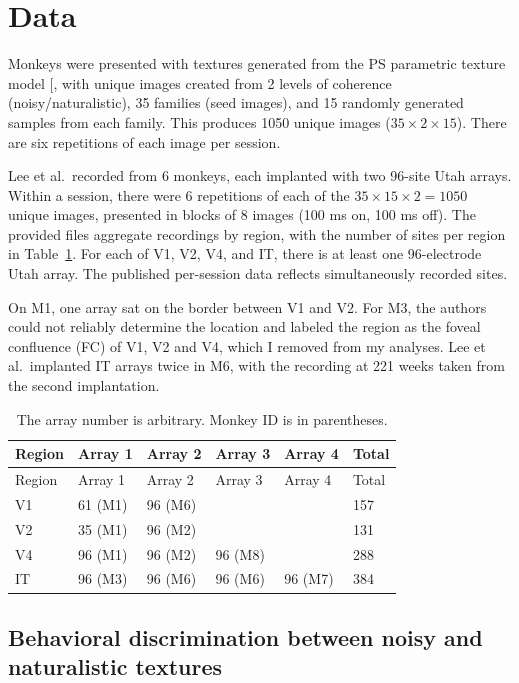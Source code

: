 \documentclass[
  11pt,
  letterpaper,
  DIV=11,
  numbers=noendperiod]{scrartcl}
\begin{document}
\section{Data}\label{sec-data}

Monkeys were presented with textures generated from the PS parametric
texture model {[}\citeproc{ref-portilla_parametric_2000}{1}{]}, with
unique images created from 2 levels of coherence (noisy/naturalistic),
35 families (seed images), and 15 randomly generated samples from each
family. This produces 1050 unique images (\(35 \times 2 \times 15\)).
There are six repetitions of each image per session.

Lee et al.~recorded from 6 monkeys, each implanted with two 96-site Utah
arrays. Within a session, there were 6 repetitions of each of the
\(35 \times 15 \times 2 = 1050\) unique images, presented in blocks of 8
images (100 ms on, 100 ms off). The provided files aggregate recordings
by region, with the number of sites per region in Table~\ref{tbl-sites}.
For each of V1, V2, V4, and IT, there is at least one 96-electrode Utah
array. The published per-session data reflects simultaneously recorded
sites.

On M1, one array sat on the border between V1 and V2. For M3, the
authors could not reliably determine the location and labeled the region
as the foveal confluence (FC) of V1, V2 and V4, which I removed from my
analyses. Lee et al.~implanted IT arrays twice in M6, with the recording
at 221 weeks taken from the second implantation.

\begin{longtable}[]{@{}llllll@{}}
\caption{The array number is arbitrary. Monkey ID is in
parentheses.}\label{tbl-sites}\tabularnewline
\toprule\noalign{}
Region & Array 1 & Array 2 & Array 3 & Array 4 & Total \\
\midrule\noalign{}
\endfirsthead
\toprule\noalign{}
Region & Array 1 & Array 2 & Array 3 & Array 4 & Total \\
\midrule\noalign{}
\endhead
\bottomrule\noalign{}
\endlastfoot
V1 & 61 (M1) & 96 (M6) & & & 157 \\
V2 & 35 (M1) & 96 (M2) & & & 131 \\
V4 & 96 (M1) & 96 (M2) & 96 (M8) & & 288 \\
IT & 96 (M3) & 96 (M6) & 96 (M6) & 96 (M7) & 384 \\
\end{longtable}

\subsection{Behavioral discrimination between noisy and naturalistic
textures}\label{behavioral-discrimination-between-noisy-and-naturalistic-textures}
\end{document}
